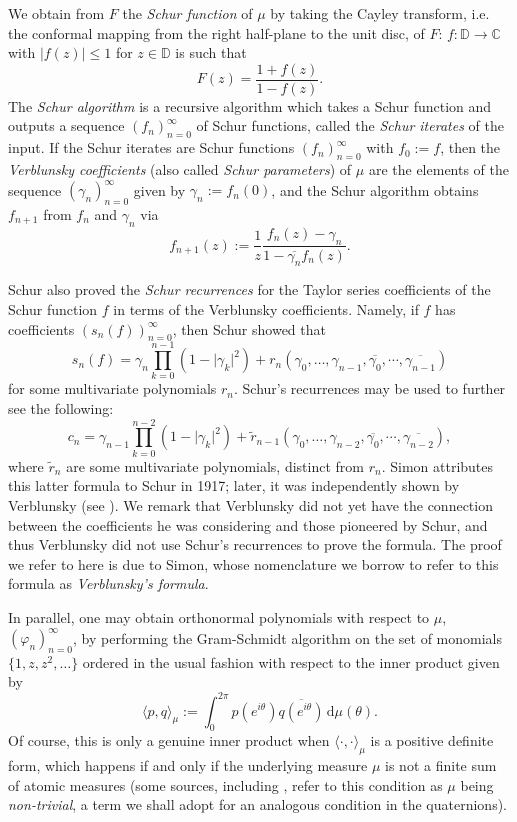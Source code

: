 \documentclass[11pt,reqno]{amsart}
\def\p{\varphi}
\def\g{\gamma}
\def\th{\theta}
\def\rmd{\mathrm{d}}
\def\CC{\mathbb{C}}
\def\DD{\mathbb{D}}
\theoremstyle{definition}
\numberwithin{equation}{section}
\renewcommand{\tilde}{\widetilde}
\begin{document}
We obtain from \(F\) the \emph{Schur function} of \(\mu\) by taking the Cayley transform, i.e. the conformal mapping from the right half-plane to the unit disc, of \(F\): \(f : \DD \to \CC\) with \(\lvert f(z) \rvert \leq 1\) for \(z \in \DD\) is such that
\[
    F(z) = \frac{1 + f(z)}{1 - f(z)}.
\]
The \emph{Schur algorithm} is a recursive algorithm which takes a Schur function and outputs a sequence \((f_n)_{n=0}^{\infty}\) of Schur functions, called the \emph{Schur iterates} of the input. If the Schur iterates are Schur functions \((f_n)_{n=0}^{\infty}\) with \(f_0 := f\), then the \emph{Verblunsky coefficients} (also called \emph{Schur parameters}) of \(\mu\) are the elements of the sequence \((\g_n)_{n=0}^{\infty}\) given by \(\g_n := f_n(0)\), and the Schur algorithm obtains \(f_{n+1}\) from \(f_n\) and \(\g_n\) via
\[
    f_{n+1}(z) := \frac{1}{z} \frac{f_n(z) - \g_n}{1 - \overline{\g_n}f_n(z)}.
\]

Schur also proved \cite{Sch86a} the \emph{Schur recurrences} for the Taylor series coefficients of the Schur function \(f\) in terms of the Verblunsky coefficients. Namely, if \(f\) has coefficients \((s_n(f))_{n=0}^{\infty}\), then Schur showed that
\[
    s_n(f) = \g_n \prod_{k=0}^{n-1} (1 - \lvert \g_k \rvert^2) + r_n(\g_0, \ldots, \g_{n-1}, \overline{\g_0}, \cdots, \overline{\g_{n-1}})
\]
for some multivariate polynomials \(r_n\). Schur's recurrences may be used to further see the following:
\[
    c_n = \g_{n-1} \prod_{k=0}^{n-2} (1 - \lvert \g_k\rvert^2) + \tilde{r}_{n-1}(\g_0, \ldots, \g_{n-2}, \overline{\g_0}, \cdots, \overline{\g_{n-2}}),
\]
where \(\tilde{r}_n\) are some multivariate polynomials, distinct from \(r_n\). Simon \cite{Sim05a} attributes this latter formula to Schur in 1917; later, it was independently shown by Verblunsky (see \cite[Theorem 1]{Ver35a}). We remark that Verblunsky did not yet have the connection between the coefficients he was considering and those pioneered by Schur, and thus Verblunsky did not use Schur's recurrences to prove the formula. The proof we refer to here is due to Simon, whose nomenclature we borrow to refer to this formula as \emph{Verblunsky's formula}.

In parallel, one may obtain orthonormal polynomials with respect to \(\mu\), \((\p_n)_{n=0}^{\infty}\), by performing the Gram-Schmidt algorithm on the set of monomials \(\{1, z, z^2, \ldots\}\) ordered in the usual fashion with respect to the inner product given by
\[
    \langle p, q \rangle_\mu := \int_0^{2\pi} p(e^{i\th}) \overline{q(e^{i\th})} \, \rmd\mu(\th).
\]
Of course, this is only a genuine inner product when \(\langle \cdot, \cdot \rangle_\mu\) is a positive definite form, which happens if and only if the underlying measure \(\mu\) is not a finite sum of atomic measures (some sources, including \cite{Sim05a}, refer to this condition as \(\mu\) being \emph{non-trivial}, a term we shall adopt for an analogous condition in the quaternions).
\end{document}

